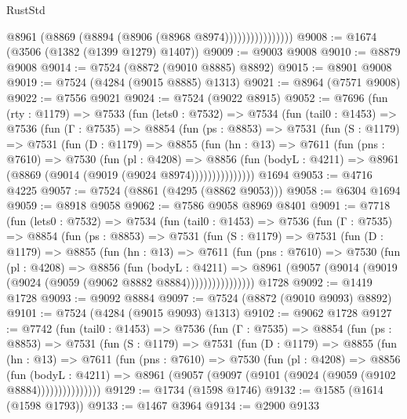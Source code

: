 \begin{lexlean}{RustStd}
\begin{coremodule}
                          @8961 (@8869 (@8894 (@8906 (@8968 @8974))))))))))))))))
@9008 := @1674 (@3506 (@1382 (@1399 @1279) @1407))
@9009 := @9003 @9008
@9010 := @8879 @9008
@9014 := @7524 (@8872 (@9010 @8885) @8892)
@9015 := @8901 @9008
@9019 := @7524 (@4284 (@9015 @8885) @1313)
@9021 := @8964 (@7571 @9008)
@9022 := @7556 @9021
@9024 := @7524 (@9022 @8915)
@9052 := @7696
    (fun (rty : @1179) =>
    @7533
      (fun (lets0 : @7532) =>
      @7534
        (fun (tail0 : @1453) =>
        @7536
          (fun (Γ : @7535) =>
          @8854
            (fun (ps : @8853) =>
            @7531
              (fun (S : @1179) =>
              @7531
                (fun (D : @1179) =>
                @8855
                  (fun (hn : @13) =>
                  @7611
                    (fun (pns : @7610) =>
                    @7530
                      (fun (pl : @4208) =>
                      @8856
                        (fun (bodyL : @4211) =>
                        @8961 (@8869 (@9014 (@9019 (@9024 @8974)))))))))))))))
    @1694
@9053 := @4716 @4225
@9057 := @7524 (@8861 (@4295 (@8862 @9053)))
@9058 := @6304 @1694
@9059 := @8918 @9058
@9062 := @7586 @9058 @8969 @8401
@9091 := @7718
    (fun (lets0 : @7532) =>
    @7534
      (fun (tail0 : @1453) =>
      @7536
        (fun (Γ : @7535) =>
        @8854
          (fun (ps : @8853) =>
          @7531
            (fun (S : @1179) =>
            @7531
              (fun (D : @1179) =>
              @8855
                (fun (hn : @13) =>
                @7611
                  (fun (pns : @7610) =>
                  @7530
                    (fun (pl : @4208) =>
                    @8856
                      (fun (bodyL : @4211) =>
                      @8961 (@9057 (@9014 (@9019 (@9024 (@9059 (@9062 @8882 @8884))))))))))))))))
    @1728
@9092 := @1419 @1728
@9093 := @9092 @8884
@9097 := @7524 (@8872 (@9010 @9093) @8892)
@9101 := @7524 (@4284 (@9015 @9093) @1313)
@9102 := @9062 @1728
@9127 := @7742
    (fun (tail0 : @1453) =>
    @7536
      (fun (Γ : @7535) =>
      @8854
        (fun (ps : @8853) =>
        @7531
          (fun (S : @1179) =>
          @7531
            (fun (D : @1179) =>
            @8855
              (fun (hn : @13) =>
              @7611
                (fun (pns : @7610) =>
                @7530
                  (fun (pl : @4208) =>
                  @8856
                    (fun (bodyL : @4211) =>
                    @8961 (@9057 (@9097 (@9101 (@9024 (@9059 (@9102 @8884)))))))))))))))
@9129 := @1734 (@1598 @1746)
@9132 := @1585 (@1614 (@1598 @1793))
@9133 := @1467 @3964
@9134 := @2900 @9133

\end{coremodule}
\end{lexlean}

